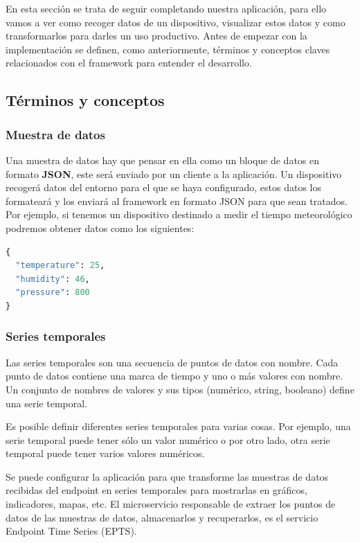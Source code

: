En esta sección se trata de seguir completando nuestra aplicación, para ello vamos a ver como recoger datos de un dispositivo, visualizar estos datos y como transformarlos para darles un uso productivo. Antes de empezar con la implementación se definen, como anteriormente, términos y conceptos claves relacionados con el framework para entender el desarrollo. \cite{kaaiotCollectData}

\subsection{Términos y conceptos}

\subsubsection{Muestra de datos}

Una muestra de datos hay que pensar en ella como un bloque de datos en formato \textbf{JSON}, este será enviado por un cliente a la aplicación. Un dispositivo recogerá datos del entorno para el que se haya configurado, estos datos los formateará y los enviará al framework en formato JSON para que sean tratados. Por ejemplo, si tenemos un dispositivo destinado a medir el tiempo meteorológico podremos obtener datos como los siguientes:

\begin{lstlisting}[language=Python]
{
  "temperature": 25,
  "humidity": 46,
  "pressure": 800
}
\end{lstlisting}

\subsubsection{Series temporales}

Las series temporales son una secuencia de puntos de datos con nombre. Cada punto de datos contiene una marca de tiempo y uno o más valores con nombre. Un conjunto de nombres de valores y sus tipos (numérico, string, booleano) define una serie temporal.

Es posible definir diferentes series temporales para varias cosas. Por ejemplo, una serie temporal puede tener sólo un valor numérico o por otro lado, otra serie temporal puede tener varios valores numéricos.

Se puede configurar la aplicación para que transforme las muestras de datos recibidas del endpoint en series temporales para mostrarlas en gráficos, indicadores, mapas, etc. El microservicio responsable de extraer los puntos de datos de las muestras de datos, almacenarlos y recuperarlos, es el servicio Endpoint Time Series (EPTS).

